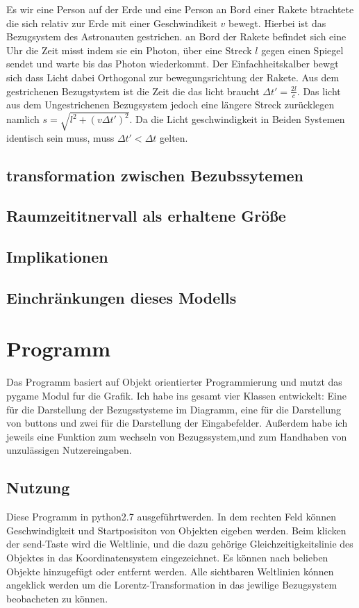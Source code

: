 \documentclass[12pt]{article}
\begin{document}
Es wir eine Person auf der Erde und eine Person an Bord einer Rakete btrachtete die sich relativ zur Erde mit einer Geschwindikeit $v$ bewegt.
Hierbei ist das Bezugsystem des Astronauten gestrichen.
an Bord der Rakete befindet sich eine Uhr die Zeit misst indem sie ein Photon, über eine Streck $l$ gegen einen Spiegel sendet und warte bis das Photon wiederkommt.
Der Einfachheitskalber bewgt sich dass Licht dabei Orthogonal zur bewegungsrichtung der Rakete.
Aus dem gestrichenen Bezugstystem ist die Zeit die das licht braucht $\Delta t' = \frac{2l}{c}$.
Das licht aus dem Ungestrichenen Bezugsystem jedoch eine längere Streck zurücklegen namlich $s = \sqrt{l^2 + (v \Delta t')^2}$.
Da die Licht geschwindigkeit in Beiden Systemen identisch sein muss, muss $\Delta t' < \Delta t$ gelten.


\subsection{transformation zwischen Bezubssytemen}
\subsection{Raumzeititnervall als erhaltene Größe}
\subsection{Implikationen}
\subsection{Einchränkungen dieses Modells}
\section{Programm}
Das Programm basiert auf Objekt orientierter Programmierung und mutzt das pygame Modul fur die Grafik.
Ich habe ins gesamt vier Klassen entwickelt:
Eine für die Darstellung der Bezugsstysteme im Diagramm, eine für die Darstellung von buttons und zwei für die Darstellung der Eingabefelder.
Außerdem habe ich jeweils eine Funktion zum wechseln von Bezugssystem,und zum Handhaben von unzulässigen Nutzereingaben.
\subsection{Nutzung}
Diese Programm in python2.7 ausgeführtwerden.
In dem rechten Feld können Geschwindigkeit und Startposisiton von Objekten eigeben werden.
Beim klicken der send-Taste wird die Weltlinie, und die dazu gehörige Gleichzeitigkeitslinie des Objektes in das Koordinatensystem eingezeichnet.
Es können nach belieben Objekte hinzugefügt oder entfernt werden.
Alle sichtbaren Weltlinien kónnen angeklick werden um die Lorentz-Transformation in das jewilige Bezugsystem beobacheten zu können.
\end{document}
